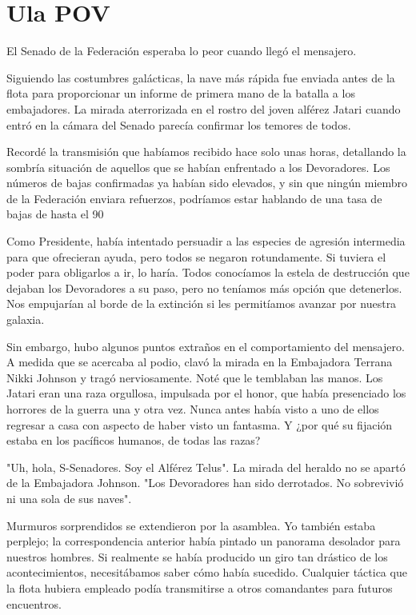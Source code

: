 \documentclass[spanish,12pt,a4paper,oneside,titlepage]{book}
\begin{document}
    \chapter{Ula POV}

    El Senado de la Federación esperaba lo peor cuando llegó el mensajero.

    Siguiendo las costumbres galácticas, la nave más rápida fue enviada antes de la flota para proporcionar un informe de primera mano de la batalla a los embajadores. La mirada aterrorizada en el rostro del joven alférez Jatari cuando entró en la cámara del Senado parecía confirmar los temores de todos.

    Recordé la transmisión que habíamos recibido hace solo unas horas, detallando la sombría situación de aquellos que se habían enfrentado a los Devoradores. Los números de bajas confirmadas ya habían sido elevados, y sin que ningún miembro de la Federación enviara refuerzos, podríamos estar hablando de una tasa de bajas de hasta el 90%

    Como Presidente, había intentado persuadir a las especies de agresión intermedia para que ofrecieran ayuda, pero todos se negaron rotundamente. Si tuviera el poder para obligarlos a ir, lo haría. Todos conocíamos la estela de destrucción que dejaban los Devoradores a su paso, pero no teníamos más opción que detenerlos. Nos empujarían al borde de la extinción si les permitíamos avanzar por nuestra galaxia.

    Sin embargo, hubo algunos puntos extraños en el comportamiento del mensajero. A medida que se acercaba al podio, clavó la mirada en la Embajadora Terrana Nikki Johnson y tragó nerviosamente. Noté que le temblaban las manos. Los Jatari eran una raza orgullosa, impulsada por el honor, que había presenciado los horrores de la guerra una y otra vez. Nunca antes había visto a uno de ellos regresar a casa con aspecto de haber visto un fantasma. Y ¿por qué su fijación estaba en los pacíficos humanos, de todas las razas?

    "Uh, hola, S-Senadores. Soy el Alférez Telus". La mirada del heraldo no se apartó de la Embajadora Johnson. "Los Devoradores han sido derrotados. No sobrevivió ni una sola de sus naves".

    Murmuros sorprendidos se extendieron por la asamblea. Yo también estaba perplejo; la correspondencia anterior había pintado un panorama desolador para nuestros hombres. Si realmente se había producido un giro tan drástico de los acontecimientos, necesitábamos saber cómo había sucedido. Cualquier táctica que la flota hubiera empleado podía transmitirse a otros comandantes para futuros encuentros.
\end{document}
